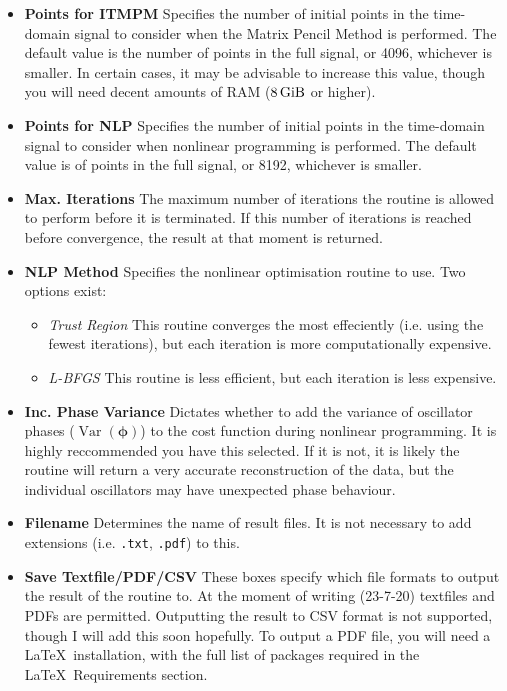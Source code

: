 \documentclass[12pt]{article}
\begin{document}
\begin{itemize}[leftmargin=*, label={}]
  \item \textbf{Points for ITMPM} Specifies the number of initial points in the time-domain signal to consider when the Matrix Pencil Method is performed. The default value is the number of points in the full signal, or 4096, whichever is smaller. In certain cases, it may be advisable to increase this value, though you will need decent amounts of RAM ($\SI{8}{\gibi\byte}$ or higher).
  \item \textbf{Points for NLP} Specifies the number of initial points in the time-domain signal to consider when nonlinear programming is performed. The default value is of points in the full signal, or 8192, whichever is smaller.
  \item \textbf{Max. Iterations} The maximum number of iterations the routine is allowed to perform before it is terminated. If this number of iterations is reached before convergence, the result at that moment is returned.
  \item \textbf{NLP Method} Specifies the nonlinear optimisation routine to use. Two options exist:
  \begin{itemize}[label={}]
    \setlength\itemsep{0.2em}
    \item \textit{Trust Region} This routine converges the most effeciently (i.e. using the fewest iterations), but each iteration is more computationally expensive.
    \item \textit{L-BFGS} This routine is less efficient, but each iteration is less expensive.
  \end{itemize}
  \item \textbf{Inc. Phase Variance} Dictates whether to add the variance of oscillator phases ($\operatorname{Var}(\bm{\phi})$) to the cost function during nonlinear programming. It is highly reccommended you have this selected. If it is not, it is likely the routine will return a very accurate reconstruction of the data, but the individual oscillators may have unexpected phase behaviour.
  \item \textbf{Filename} Determines the name of result files. It is not necessary to add extensions (i.e. \texttt{.txt}, \texttt{.pdf}) to this.
  \item \textbf{Save Textfile/PDF/CSV} These boxes specify which file formats to output the result of the routine to. At the moment of writing (23-7-20) textfiles and PDFs are permitted. Outputting the result to CSV format is not supported, though I will add this soon hopefully. To output a PDF file, you will need a \LaTeX\ installation, with the full list of packages required in the \LaTeX\ Requirements section.
\end{itemize}
\end{document}
